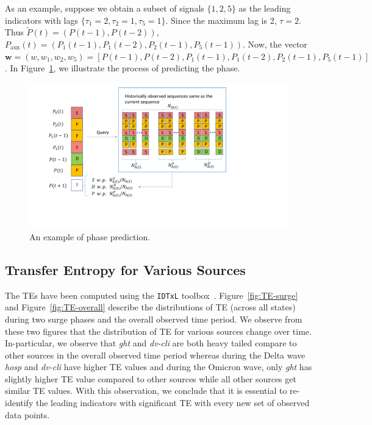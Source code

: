 \documentclass[conference,compsoc]{IEEEtran}
\newcommand{\Paux}{P_{\textrm{aux}}}
\begin{document}
As an example, suppose we obtain a subset of signals $\{1,2,5\}$ as the leading indicators with lags $\{\tau_1=2, \tau_2=1, \tau_5=1\}$. Since the maximum lag is 2, $\tau=2$. Thus $\tilde P(t) = (P(t-1), P(t-2))$, $\Paux(t) = (P_1(t-1), P_1(t-2), P_2(t-1), P_5(t-1))$. 
Now, the vector $\mathbf{w}=(w, w_1, w_2, w_5)=[P(t-1), P(t-2), P_1(t-1), P_1(t-2), P_2(t-1), P_5(t-1)]$. In Figure~\ref{fig:seq_ex}, we illustrate the process of predicting the phase. 
\begin{figure}
    \centering
    \includegraphics[width=.75\textwidth]{PI-BMA-IEEE-BigData2022_extended/figs/seq_freq_algo.pdf}
    \caption{An example of phase prediction.}
    \label{fig:seq_ex}
\end{figure}
\subsection{Transfer Entropy for Various Sources} \label{subsec:dynamic-TE-src}
The TEs have been computed using the \verb|IDTxL| toolbox~\cite{wollstadt2018idtxl}. 
Figure~\ref{fig:TE-surge} and Figure~\ref{fig:TE-overall} describe the   distributions of TE (across all states)  during two surge phases and the overall observed time period. We observe from these two figures that the distribution of TE for various sources change over time. In-particular, we observe that \emph{ght} and \emph{dv-cli} are both heavy tailed compare to other sources in the overall observed time period whereas during the Delta wave \emph{hosp} and \emph{dv-cli} have higher TE values and during the Omicron wave, only \emph{ght} has slightly higher TE value compared to other sources while all other sources get similar TE values. With this observation, we conclude that it is essential to re-identify the leading indicators with significant TE with every new set of observed data points. 
\end{document}
